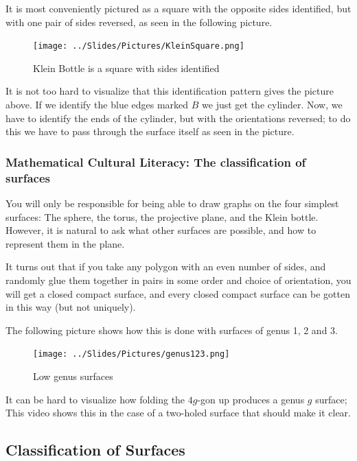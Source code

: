 \documentclass[]{article}
\begin{document}
It is most conveniently pictured as a square with the opposite sides
identified, but with one pair of sides reversed, as seen in the
following picture.

\begin{figure}[htbp]
\centering
\texttt{[image: ../Slides/Pictures/KleinSquare.png]}
\caption{Klein Bottle is a square with sides identified}
\end{figure}

It is not too hard to visualize that this identification pattern gives
the picture above. If we identify the blue edges marked \(B\) we just
get the cylinder. Now, we have to identify the ends of the cylinder, but
with the orientations reversed; to do this we have to pass through the
surface itself as seen in the picture.

\subsubsection{Mathematical Cultural Literacy: The classification of
surfaces}\label{mathematical-cultural-literacy-the-classification-of-surfaces}

You will only be responsible for being able to draw graphs on the four
simplest surfaces: The sphere, the torus, the projective plane, and the
Klein bottle. However, it is natural to ask what other surfaces are
possible, and how to represent them in the plane.

It turns out that if you take any polygon with an even number of sides,
and randomly glue them together in pairs in some order and choice of
orientation, you will get a closed compact surface, and every closed
compact surface can be gotten in this way (but not uniquely).

The following picture shows how this is done with surfaces of genus 1, 2
and 3.

\begin{figure}[htbp]
\centering
\texttt{[image: ../Slides/Pictures/genus123.png]}
\caption{Low genus surfaces}
\end{figure}

It can be hard to visualize how folding the \(4g\)-gon up produces a
genus \(g\) surface; This video shows this in the case of a two-holed
surface that should make it clear.

\subsection{Classification of Surfaces}\label{classification-of-surfaces}
\end{document}
